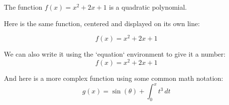 \documentclass{article}
\begin{document}
The function $f(x) = x^2 + 2x + 1$ is a quadratic polynomial.

Here is the same function, centered and displayed on its own line:

$$ f(x) = x^2 + 2x + 1 $$

We can also write it using the `equation` environment to give it a number:
\begin{equation}
    f(x) = x^2 + 2x + 1
\end{equation}

And here is a more complex function using some common math notation:
\begin{equation}
    g(x) = \sin(\theta) + \int_{0}^{x} t^3 \,dt
\end{equation}
\end{document}
